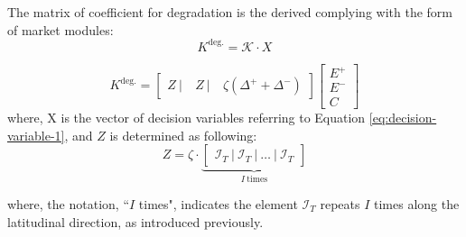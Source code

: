 The matrix of coefficient for degradation is the derived complying with the form of market modules:
\begin{equation}
K^{\text{deg.}}  = \mathcal{K} \cdot X
\end{equation}

\begin{equation*}
K^{\text{deg.}} = \begin{bmatrix}
Z~|~&Z~|~& \zeta (\Delta^{+} +\Delta^{-})
\end{bmatrix} \begin{bmatrix}
E^+ \\ E^- \\ C
\end{bmatrix}
\end{equation*}
where, X is the vector of decision variables referring to Equation \eqref{eq:decision-variable-1}, and $Z$ is determined as following:
\begin{equation*}
Z = \zeta \cdot %
\underbrace{\begin{bmatrix}
	\mathcal{I}_T~|~\mathcal{I}_T~|~ \dots~|~\mathcal{I}_T 
	\end{bmatrix}}_{I~\text{times}}
\end{equation*}


where, the notation, ``$I$ times", indicates the element $\mathcal{I}_T$ repeats $I$ times along the latitudinal direction, as introduced previously.

